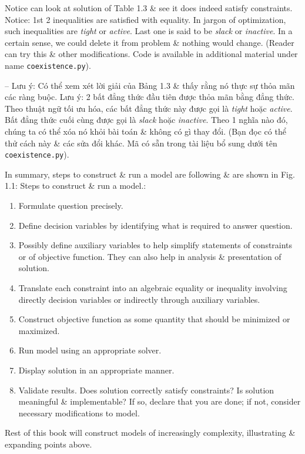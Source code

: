 \documentclass{article}
\begin{document}
\begin{itemize}
\begin{itemize}
        Notice can look at solution of Table 1.3 \& see it does indeed satisfy constraints. Notice: 1st 2 inequalities are satisfied with equality. In jargon of optimization, such inequalities are {\it tight} or {\it active}. Last one is said to be {\it slack} or {\it inactive}. In a certain sense, we could delete it from problem \& nothing would change. (Reader can try this \& other modifications. Code is available in additional material under name {\tt coexistence.py}).

        -- Lưu ý: Có thể xem xét lời giải của Bảng 1.3 \& thấy rằng nó thực sự thỏa mãn các ràng buộc. Lưu ý: 2 bất đẳng thức đầu tiên được thỏa mãn bằng đẳng thức. Theo thuật ngữ tối ưu hóa, các bất đẳng thức này được gọi là {\it tight} hoặc {\it active}. Bất đẳng thức cuối cùng được gọi là {\it slack} hoặc {\it inactive}. Theo 1 nghĩa nào đó, chúng ta có thể xóa nó khỏi bài toán \& không có gì thay đổi. (Bạn đọc có thể thử cách này \& các sửa đổi khác. Mã có sẵn trong tài liệu bổ sung dưới tên {\tt coexistence.py}).

        In summary, steps to construct \& run a model are following \& are shown in {\sf Fig. 1.1: Steps to construct \& run a model.}:
        \begin{enumerate}
            \item Formulate question precisely.
            \item Define decision variables by identifying what is required to answer question.
            \item Possibly define auxiliary variables to help simplify statements of constraints or of objective function. They can also help in analysis \& presentation of solution.
            \item Translate each constraint into an algebraic equality or inequality involving directly decision variables or indirectly through auxiliary variables.
            \item Construct objective function as some quantity that should be minimized or maximized.
            \item Run model using an appropriate solver.
            \item Display solution in an appropriate manner.
            \item Validate results. Does solution correctly satisfy constraints? Is solution meaningful \& implementable? If so, declare that you are done; if not, consider necessary modifications to model.
        \end{enumerate}
        Rest of this book will construct models of increasingly complexity, illustrating \& expanding points above.


\end{itemize}
\end{itemize}
\end{document}
